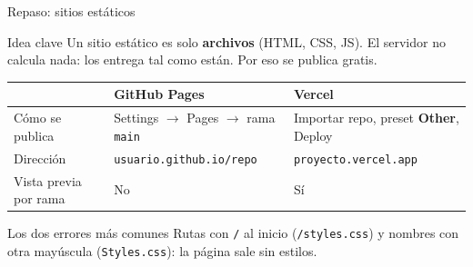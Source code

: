 \documentclass[aspectratio=169,10pt,c]{beamer}
\begin{document}
\begin{frame}{Repaso: sitios estáticos}
\begin{block}{Idea clave}
\small Un sitio estático es solo \textbf{archivos} (HTML, CSS, JS). El servidor no calcula nada: los entrega tal como están. Por eso se publica gratis.
\end{block}
\renewcommand{\arraystretch}{1.3}
\centering\small
\begin{tabular}{@{}p{3.4cm}p{4.6cm}p{4.6cm}@{}}
\toprule
& \textbf{GitHub Pages} & \textbf{Vercel}\\
\midrule
Cómo se publica & Settings $\rightarrow$ Pages $\rightarrow$ rama \texttt{main} & Importar repo, preset \textbf{Other}, Deploy\\
Dirección & \texttt{usuario.github.io/repo} & \texttt{proyecto.vercel.app}\\
Vista previa por rama & No & Sí\\
\bottomrule
\end{tabular}
\par\vspace{3mm}
\begin{alertblock}{Los dos errores más comunes}
\small Rutas con \texttt{/} al inicio (\texttt{/styles.css}) y nombres con otra mayúscula (\texttt{Styles.css}): la página sale sin estilos.
\end{alertblock}
\end{frame}
\end{document}
